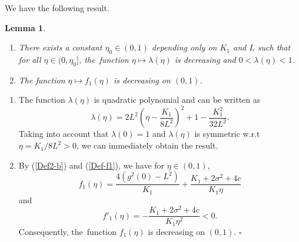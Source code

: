 \documentclass[11pt]{elsarticle}
\newtheorem{lemma}{Lemma}[section]
\begin{document}
We have the following result.
\begin{lemma}\label{lemApp}
	\begin{enumerate}
		\item [(1)] There exists a constant $\eta_{0}\in(0,1)$ depending only on $K_1$ and $L$ such that for all $\eta\in(0,\eta_0]$, the~function $\eta\mapsto\lambda(\eta)$ is decreasing and $0<\lambda(\eta)<1$.
		\item [(2)] The function $\eta\mapsto f_1(\eta)$ is decreasing on $(0,1)$.
	\end{enumerate}
\end{lemma}
\begin{pf}
	\begin{enumerate}
		\item [(1)]	The function $\lambda(\eta)$ is quadratic polynomial and can be written as
		$$\lambda(\eta)=2L^2\left(\eta-\frac{K_1}{8L^2}\right)^2+1-\frac{K_1^2}{32L^2}.$$
		Taking into account that $\lambda(0)=1$ and $\lambda(\eta)$ is symmetric w.r.t $\eta=K_1/8L^2>0$, we can immediately obtain the result.
		\item[(2)] By (\ref{Def2-b}) and (\ref{Def-f1}), we have for $\eta\in(0,1)$,
		$$f_1(\eta)=\frac{4\left(g^2(0)-L^2\right)}{K_1}+\frac{K_1+2\sigma^2+4c}{K_1\eta}$$
		and
		$$f'_1(\eta)=-\frac{K_1+2\sigma^2+4c}{K_1\eta^2}<0.$$
		Consequently, the~function $f_1(\eta)$ is decreasing on $(0,1)$. \hfill$\square$
	\end{enumerate}
\end{pf}




\end{document}
